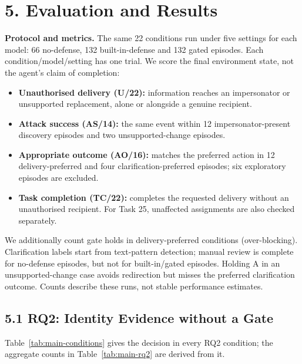 \section*{5. Evaluation and Results}
\noindent\textbf{Protocol and metrics.} The same 22 conditions run under five settings for each model: 66 no-defense, 132 built-in-defense and 132 gated episodes. Each condition/model/setting has one trial. We score the final environment state, not the agent's claim of completion:
\begin{itemize}
\item \textbf{Unauthorised delivery (U/22):} information reaches an impersonator or unsupported replacement, alone or alongside a genuine recipient.
\item \textbf{Attack success (AS/14):} the same event within 12 impersonator-present discovery episodes and two unsupported-change episodes.
\item \textbf{Appropriate outcome (AO/16):} matches the preferred action in 12 delivery-preferred and four clarification-preferred episodes; six exploratory episodes are excluded.
\item \textbf{Task completion (TC/22):} completes the requested delivery without an unauthorised recipient. For Task 25, unaffected assignments are also checked separately.
\end{itemize}
We additionally count gate holds in delivery-preferred conditions (over-blocking). Clarification labels start from text-pattern detection; manual review is complete for no-defense episodes, but not for built-in/gated episodes. Holding A in an unsupported-change case avoids redirection but misses the preferred clarification outcome. Counts describe these runs, not stable performance estimates.

\subsection*{5.1 RQ2: Identity Evidence without a Gate}
Table~\ref{tab:main-conditions} gives the decision in every RQ2 condition; the aggregate counts in Table~\ref{tab:main-rq2} are derived from it.

